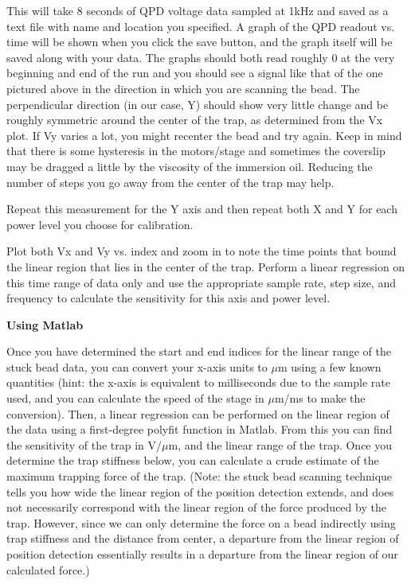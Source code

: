 \documentclass{../lab}
\begin{document}
This will take 8 seconds of QPD voltage data sampled at 1kHz and saved as a text file with name and location you specified. A graph of the QPD readout vs. time will be shown when you click the save button, and the graph itself will be saved along with your data. The graphs should both read roughly 0 at the very beginning and end of the run and you should see a signal like that of the one pictured above in the direction in which you are scanning the bead. The perpendicular direction (in our case, Y) should show very little change and be roughly symmetric around the center of the trap, as determined from the Vx plot. If Vy varies a lot, you might recenter the bead and try again. Keep in mind that there is some hysteresis in the motors/stage and sometimes the coverslip may be dragged a little by the viscosity of the immersion oil. Reducing the number of steps you go away from the center of the trap may help.

Repeat this measurement for the Y axis and then repeat both X and Y for each power level you choose for calibration.

Plot both Vx and Vy vs. index and zoom in to note the time points that bound the linear region that lies in the center of the trap. Perform a linear regression on this time range of data only and use the appropriate sample rate, step size, and frequency to calculate the sensitivity for this axis and power level.

\textbf{Using Matlab}

Once you have determined the start and end indices for the linear range of the stuck bead data, you can convert your x-axis units to $ \mu $m using a few known quantities (hint: the x-axis is equivalent to milliseconds due to the sample rate used, and you can calculate the speed of the stage in $ \mu $m/ms to make the conversion). Then, a linear regression can be performed on the linear region of the data using a first-degree polyfit function in Matlab. From this you can find the sensitivity of the trap in V/$ \mu $m, and the linear range of the trap. Once you determine the trap stiffness below, you can calculate a crude estimate of the maximum trapping force of the trap. (Note: the stuck bead scanning technique tells you how wide the linear region of the position detection extends, and does not necessarily correspond with the linear region of the force produced by the trap. However, since we can only determine the force on a bead indirectly using trap stiffness and the distance from center, a departure from the linear region of position detection essentially results in a departure from the linear region of our calculated force.)
\end{document}
